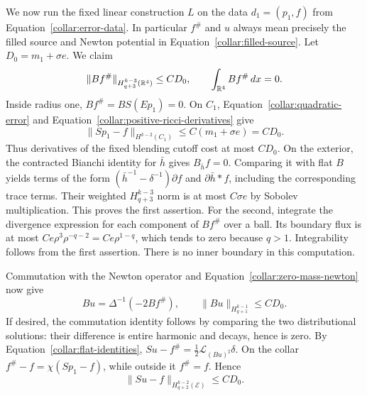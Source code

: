 We now run the fixed linear construction \(L\) on the data
\(d_1=(p_1,f)\) from Equation~\eqref{collar:error-data}.  In
particular \(f^\#\) and \(u\) always mean precisely the filled
source and Newton potential in Equation~\eqref{collar:filled-source}.
Let \(D_0=m_1+\sigma e\).  We claim
\begin{equation}
 \|Bf^\#\|_{H^{k-3}_{q+3}(\mathbb{R}^4)}\le CD_0,
 \qquad \int_{\mathbb{R}^4}Bf^\#\,dx=0.
 \label{collar:bianchi-source}
\end{equation}
Inside radius one, \(Bf^\#=BS(Ep_1)=0\).
On \(C_1\), Equation~\eqref{collar:quadratic-error} and
Equation~\eqref{collar:positive-ricci-derivatives} give
\[
 \|Sp_1-f\|_{H^{k-2}(C_1)}
       \le C(m_1+\sigma e)=CD_0.
\]
Thus derivatives of the fixed blending cutoff cost at most \(CD_0\).
On the exterior, the contracted Bianchi identity for \(\bar h\)
gives \(B_{\bar h}f=0\).  Comparing it with flat \(B\) yields
terms of the form
\((\bar h^{-1}-\delta^{-1})\partial f\) and
\(\partial\bar h*f\), including the corresponding trace terms.
Their weighted \(H^{k-3}_{q+3}\) norm is at most \(C\sigma e\)
by Sobolev multiplication.  This proves the first assertion.
For the second, integrate the divergence expression for each
component of \(Bf^\#\) over a ball.  Its boundary flux is at most
\(Ce\rho^3\rho^{-q-2}=Ce\rho^{1-q}\), which tends to zero
because \(q>1\).  Integrability follows from the first assertion.
There is no inner boundary in this computation.

Commutation with the Newton operator and
Equation~\eqref{collar:zero-mass-newton} now give
\[
 Bu=\Delta^{-1}(-2Bf^\#),\qquad
 \|Bu\|_{H^{k-1}_{q+1}}\le CD_0.
\]
If desired, the commutation identity follows by comparing the
two distributional solutions: their difference is entire
harmonic and decays, hence is zero.  By
Equation~\eqref{collar:flat-identities},
\(Su-f^\#=\tfrac12\mathcal L_{(Bu)^\sharp}\delta\).
On the collar \(f^\#-f=\chi(Sp_1-f)\), while outside it
\(f^\#=f\).  Hence
\begin{equation}
 \|Su-f\|_{H^{k-2}_{q+2}(\mathcal E)}\le CD_0.
 \label{collar:ricci-compatibility}
\end{equation}

